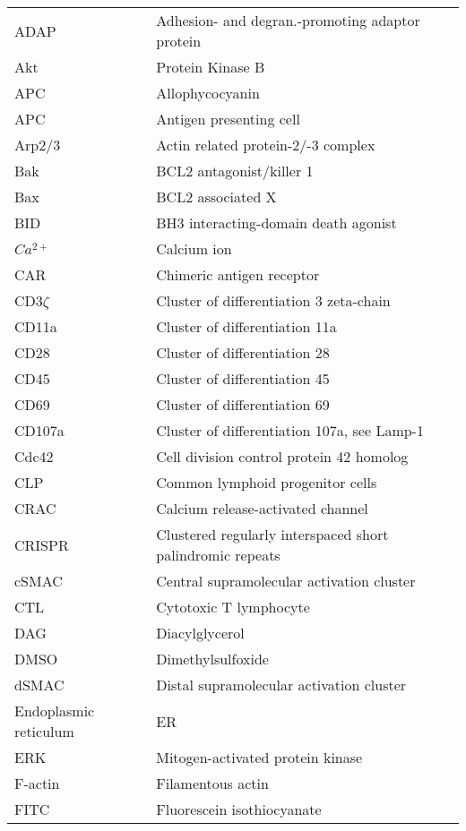 \documentclass[phd,tocprelim]{cornell}
\renewcommand{\caption}[1]{\singlespacing\hangcaption{#1}\normalspacing}
\begin{document}
\abbrlist
\begin{longtable}{ p{} p{} }
	ADAP & Adhesion- and degran.-promoting adaptor protein \\	
	Akt & Protein Kinase B \\
	APC & Allophycocyanin \\
	APC & Antigen presenting cell \\
	Arp2/3 	& Actin related protein-2/-3 complex \\
	Bak & BCL2 antagonist/killer 1 \\
	Bax & BCL2 associated X \\
	BID & BH3 interacting-domain death agonist \\
	$Ca^{2+}$ & Calcium ion \\
	CAR & Chimeric antigen receptor \\
	CD3$\zeta$ & Cluster of differentiation 3 zeta-chain \\
	CD11a & Cluster of differentiation 11a \\
	CD28 & Cluster of differentiation 28 \\
	CD45 & Cluster of differentiation 45 \\
	CD69 & Cluster of differentiation 69 \\
	CD107a & Cluster of differentiation 107a, see Lamp-1 \\
	Cdc42 & Cell division control protein 42 homolog \\
	CLP & Common lymphoid progenitor cells \\
	CRAC &  Calcium release-activated channel \\
	CRISPR & Clustered regularly interspaced short palindromic repeats \\
	cSMAC & Central supramolecular activation cluster \\
	CTL & Cytotoxic T lymphocyte \\
	DAG & Diacylglycerol \\
	DMSO & Dimethylsulfoxide \\
	dSMAC & Distal supramolecular activation cluster \\
	Endoplasmic reticulum & ER \\	
	ERK  & Mitogen-activated protein kinase \\
	F-actin & Filamentous actin \\
	FITC & Fluorescein isothiocyanate \\

\end{longtable}
\end{document}
